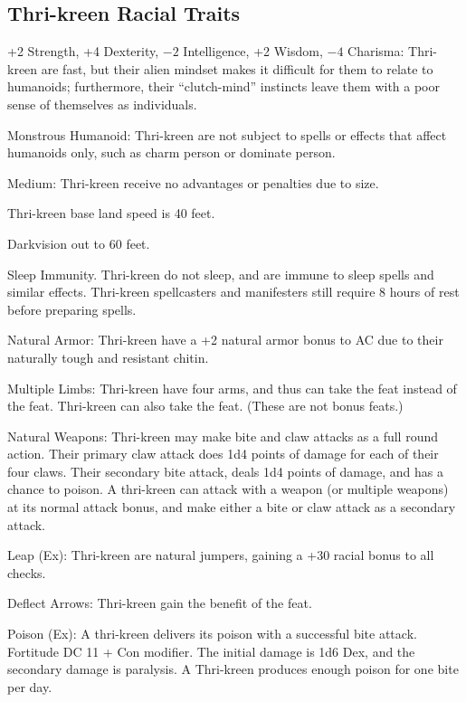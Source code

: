 \subsection{Thri-kreen Racial Traits}
\begin{itemize*}
    \item +2 Strength, +4 Dexterity, $-2$ Intelligence, +2 Wisdom, $-4$ Charisma: Thri-kreen are fast, but their alien mindset makes it difficult for them to relate to humanoids; furthermore, their ``clutch-mind'' instincts leave them with a poor sense of themselves as individuals.
    \item Monstrous Humanoid: Thri-kreen are not subject to spells or effects that affect humanoids only, such as charm person or dominate person.
    \item Medium: Thri-kreen receive no advantages or penalties due to size.
    \item Thri-kreen base land speed is 40 feet.
    \item Darkvision out to 60 feet.
    \item Sleep Immunity. Thri-kreen do not sleep, and are immune to sleep spells and similar effects. Thri-kreen spellcasters and manifesters still require 8 hours of rest before preparing spells.
    \item Natural Armor: Thri-kreen have a +2 natural armor bonus to AC due to their naturally tough and resistant chitin.
    \item Multiple Limbs: Thri-kreen have four arms, and thus can take the  feat instead of the  feat. Thri-kreen can also take the  feat. (These are not bonus feats.)
    \item Natural Weapons: Thri-kreen may make bite and claw attacks as a full round action. Their primary claw attack does 1d4 points of damage for each of their four claws. Their secondary bite attack, deals 1d4 points of damage, and has a chance to poison. A thri-kreen can attack with a weapon (or multiple weapons) at its normal attack bonus, and make either a bite or claw attack as a secondary attack.
    \item Leap (Ex): Thri-kreen are natural jumpers, gaining a +30 racial bonus to all  checks.
    \item Deflect Arrows: Thri-kreen gain the benefit of the  feat.
    \item Poison (Ex): A thri-kreen delivers its poison with a successful bite attack. Fortitude DC 11 + Con modifier. The initial damage is 1d6 Dex, and the secondary damage is paralysis. A Thri-kreen produces enough poison for one bite per day.

\end{itemize*}
